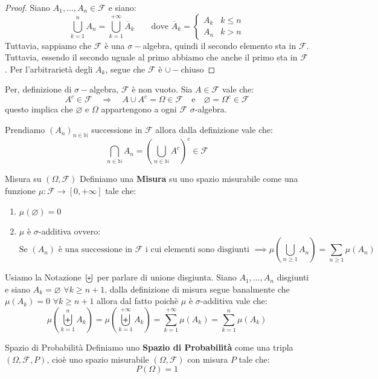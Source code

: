 \documentclass[11pt, a4paper, twoside]{article}
\begin{document}
\begin{proof}
	Siano $A_1,...,A_n \in \mathcal F$ e siano:
	\[
		\bigcup_{k=1}^n A_n = \bigcup_{k=1}^{+\infty} \overline A_k \qquad \text{dove } \overline A_k =
		\begin{cases}
			A_k & k\leq n\\
			A_n & k>n
		\end{cases}
	\]
	Tuttavia, sappiamo che $\mathcal F$ è una $\sigma-$algebra, quindi il secondo elemento sta in $\mathcal F$. Tuttavia, essendo il secondo uguale al primo abbiamo che anche il primo sta in $\mathcal F$. Per l'arbitrarietà degli $A_k$, segue che $\mathcal F$ è $\cup-$chiuso
\end{proof}
\begin{oss}
	Per, definizione di $\sigma-$algebra, $\mathcal F$ è non vuoto. Sia $A\in\mathcal F$ vale che:
	\[
		A^c  \in \mathcal F \quad\Rightarrow\quad A\cup A^c=\Omega\in \mathcal F \quad \text{e} \quad \varnothing=\Omega^c\in \mathcal F
	\]
questo implica che $\varnothing$ e $\Omega$ appartengono a ogni $\mathcal F$ $\sigma$-algebra.
\end{oss}
\begin{oss}
	Prendiamo $(A_n)_{n \in \mathbb N}$ successione in $\mathcal F$ allora dalla definizione vale che:
	\[
		\bigcap\limits_{n\in\mathbb{N}} A_n=\left(\bigcup\limits_{n\in\mathbb{N}}A^c\right)^c\in\mathcal F
	\]
\end{oss}
\begin{defn}{Misura su $(\Omega,\mathcal F)$}{}\label{Misura}
	Definiamo una \textbf{Misura} su uno spazio misurabile come una funzione $\mu:\mathcal F\rightarrow[0,+\infty]$ tale che:
	\begin{enumerate}
		\item $\mu(\varnothing)=0$
		\item $\mu$ è $\sigma$-additiva ovvero:
		\[
			\text{Se }(A_n) \text{ è una successione in }\mathcal F \text{ i cui elementi sono disgiunti } \implies\mu\left(\bigcup\limits_{n\geq1}A_n\right)=\sum\limits_{n\geq1}\mu\left(A_n\right)
		\]
	\end{enumerate}
\end{defn}
\begin{oss}
	Usiamo la Notazione $\biguplus$ per parlare di unione disgiunta. Siano $A_1,\dots,A_n$ disgiunti e siano $A_k=\varnothing$ $\forall k\geq n+1$, dalla definizione di misura segue banalmente che $\mu(A_k)=0$ $\forall k\geq n+1$ allora dal fatto poichè $\mu$ è $\sigma$-additiva vale che:
	\[
		\mu\left(\biguplus\limits_{k=1}^n A_k\right)=\mu\left(\biguplus\limits_{k=1}^{+\infty} A_k\right)=\sum\limits_{k=1}^{+\infty}\mu(A_k)=\sum\limits_{k=1}^n\mu(A_k)
	\]
\end{oss}
\begin{defn}{Spazio di Probabilità}{}
	Definiamo uno \textbf{Spazio di Probabilità} come una tripla $(\Omega,\mathcal F, P)$, cioè uno spazio misurabile $(\Omega,\mathcal F)$ con misura $P$ tale che:
	\[
		P(\Omega)= 1
	\]
\end{defn}
\end{document}
